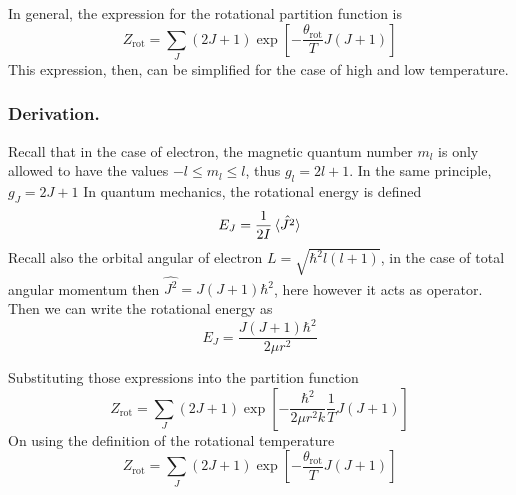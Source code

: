 \documentclass[../../../Main.tex]{subfiles}
\begin{document}
In general, the expression for the rotational partition function is 
\begin{equation*}
    Z_\text{rot}=\sum_J(2J+1)\exp\left[-\frac{\theta_\text{rot}}{T}J(J+1)\right]
\end{equation*}
This expression, then, can be simplified for the case of high and low temperature.

\subsubsection*{Derivation.} Recall that in the case of electron, the magnetic quantum number $m_l$ is only allowed to have the values $-l\leq m_l\leq l$, thus $g_l=2l+1$. In the same principle, $g_J=2J+1$ In quantum mechanics, the rotational energy is defined
\begin{equation*}
    E_J=\frac{1}{2I}\braket{\hat{J^2}}
\end{equation*}
Recall also the orbital angular of electron $L=\sqrt{\hbar^2l(l+1)}$, in the case of total angular momentum then $\hat{J^2}= J(J+1)\hbar^2$, here however it acts as operator. Then we can write the rotational energy as 
\begin{equation*}
    E_J=\frac{J(J+1)\hbar^2}{2\mu r^2 }
\end{equation*}

Substituting those expressions into the partition function
\begin{equation*}
    Z_\text{rot}=\sum_J(2J+1)\exp\left[-\frac{\hbar^2}{2\mu r^2 k}\frac{1}{T}J(J+1)\right]
\end{equation*}
On using the definition of the rotational temperature
\begin{equation*}
    Z_\text{rot}=\sum_J(2J+1)\exp\left[-\frac{\theta_\text{rot}}{T}J(J+1)\right]
\end{equation*}
\end{document}
